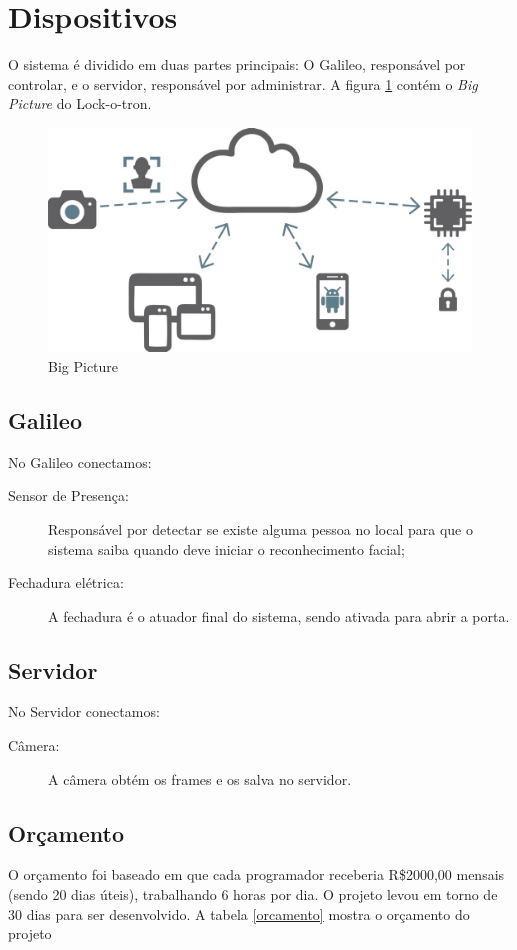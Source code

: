 \documentclass[12pt]{article}
\begin{document}
\section{Dispositivos}
    O sistema é dividido em duas partes principais: O Galileo, responsável por
    controlar, e o servidor, responsável por administrar. A figura \ref{fig:bigpicture}
    contém o \textit{Big Picture} do Lock-o-tron.

   \begin{figure}[ht]
		\centering
		\includegraphics[width=.5\textwidth]{big-picture.jpg}
		\caption{Big Picture}
		\label{fig:bigpicture}
	\end{figure}


\subsection{Galileo}
    No Galileo conectamos:
    \begin{description}
        \item[Sensor de Presença:] Responsável por detectar se existe alguma
        pessoa no local para que o sistema saiba quando deve iniciar o
        reconhecimento facial;
        \item[Fechadura elétrica:] A fechadura é o atuador final do sistema,
        sendo ativada para abrir a porta.
    \end{description}
\subsection{Servidor}
    No Servidor conectamos:
    \begin{description}
        \item[Câmera:] A câmera obtém os frames e os salva no servidor.
    \end{description}
    
\subsection{Orçamento}
	O orçamento foi baseado em que cada programador receberia R\$2000,00 mensais 
	(sendo 20 dias úteis), trabalhando 6 horas por dia. O projeto levou em torno
	de 30 dias para ser desenvolvido. A tabela \ref{orcamento} mostra o orçamento
	do projeto
	
\end{document}
